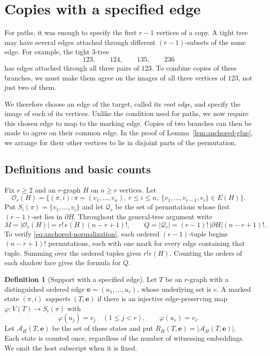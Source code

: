 \documentclass[11pt]{article}
\numberwithin{equation}{section}
\theoremstyle{definition}
\newtheorem{definition}[theorem]{Definition}
\newcommand{\cA}{\mathcal A}
\newcommand{\cO}{\mathcal O}
\newcommand{\cQ}{\mathcal Q}
\begin{document}
\section{Copies with a specified edge}
\label{sec:anchored}

For paths, it was enough to specify the first $r-1$ vertices of a
copy.  A tight tree may have several edges attached through different
$(r-1)$-subsets of the same edge.  For example, the tight
$3$-tree
\[
 123,\qquad124,\qquad135,\qquad236
\]
has edges attached through all three pairs of $123$.  To combine
copies of these branches, we must make them agree on the images of
all three vertices of $123$, not just two of them.

We therefore choose an edge of the target, called its \emph{root edge},
and specify the image of each of its vertices.  Unlike the condition
used for paths, we now require this chosen edge to map to the marking
edge.  Copies of two branches can then be made to agree on their common
edge.  In the proof of Lemma~\ref{lem:anchored-glue}, we arrange for
their other vertices to lie in disjoint parts of the permutation.

\subsection{Definitions and basic counts}

Fix $r\geq2$ and an $r$-graph $H$ on $n\geq r$ vertices.  Let
\[
 \cO_r(H)=\{(\pi,i):\pi=(v_1,\ldots,v_n),\ r\leq i\leq n,
       \ \{v_1,\ldots,v_{r-1},v_i\}\in E(H)\}.
\]
Put $S_i(\pi)=\{v_1,\ldots,v_i\}$ and let $\cQ_r$ be the set of
permutations whose first $(r-1)$-set lies in $\partial H$.  Throughout
the general-tree argument write
\begin{equation}
 M=|\cO_r(H)|=r!\,e(H)(n-r+1)!,\qquad
 Q=|\cQ_r|=(r-1)!\,|\partial H|(n-r+1)!.
 \label{eq:anchored-normalization}
\end{equation}
To verify \eqref{eq:anchored-normalization}, each ordered
$(r-1)$-tuple begins
$(n-r+1)!$ permutations, each with one mark for every edge containing
that tuple.  Summing over the ordered tuples gives $r!e(H)$.  Counting
the orders of each shadow face gives the formula for $Q$.

\begin{definition}[Support with a specified edge]
Let $T$ be an $r$-graph with a distinguished ordered edge
$\mathbf e=(u_1,\ldots,u_r)$, whose underlying set is $e$.
A marked state $(\pi,i)$ \emph{supports $(T,\mathbf e)$} if there is
an injective edge-preserving map $\varphi:V(T)\to S_i(\pi)$ with
\begin{equation}
 \varphi(u_j)=v_j\quad(1\leq j<r),\qquad
 \varphi(u_r)=v_i.
 \label{eq:anchored-support}
\end{equation}
Let $\cA_H(T,\mathbf e)$ be the set of these states and put
$R_H(T,\mathbf e)=|\cA_H(T,\mathbf e)|$.  Each state is counted once,
regardless of the number of witnessing embeddings.  We omit the host
subscript when it is fixed.
\end{definition}
\end{document}
